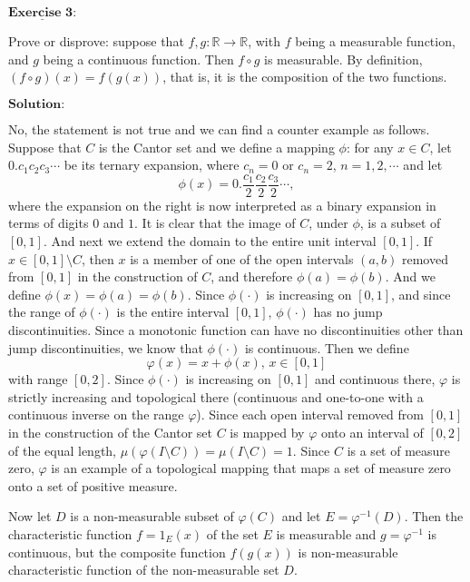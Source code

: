 \documentclass[12pt,a4paper]{ctexart}
\begin{document}
\newpage

$\underline{\textbf{Exercise 3:}}$

Prove or disprove: suppose that $f, g: \mathbb{R} \rightarrow \mathbb{R}$, with $f$ being a measurable function, and $g$ being a continuous function. Then $f \circ g$ is measurable. By definition, $(f \circ g)(x) = f(g(x))$, that is, it is the composition of the two functions.


\vspace{8pt}
$\textbf{Solution:}$

No, the statement is not true and we can find a counter example as follows. Suppose that $C$ is the Cantor set and we define a mapping $\phi$: for any $x \in C$, let $0.c_{1}c_{2}c_{3} \cdots$ be its ternary expansion, where $c_{n} = 0$ or $c_{n} = 2$, $n = 1, 2, \cdots$ and let
\begin{equation*}
    \phi(x) = 0.\frac{c_{1}}{2}\frac{c_{2}}{2}\frac{c_{3}}{2}\cdots,
\end{equation*}
where the expansion on the right is now interpreted as a binary expansion in terms of digits $0$ and $1$. It is clear that the image of $C$, under $\phi$, is a subset of $[0, 1]$. And next we extend the domain to the entire unit interval $[0, 1]$. If $x \in [0, 1] \setminus C $, then $x$ is a member of one of the open intervals $(a, b)$ removed from $[0, 1]$ in the construction of $C$, and therefore $\phi(a) = \phi(b)$. And we define $\phi(x) = \phi(a) = \phi(b)$. Since $\phi(\cdot)$ is increasing on $[0, 1]$, and since the range of $\phi(\cdot)$ is the entire interval $[0, 1]$, $\phi(\cdot)$ has no jump discontinuities. Since a monotonic function can have no discontinuities other than jump discontinuities, we know that $\phi(\cdot)$ is continuous. Then we define
$$\varphi (x) = x + \phi(x), \, x \in [0, 1]$$
with range $[0, 2]$. Since $\phi(\cdot)$ is increasing on $[0, 1]$ and continuous there, $\varphi$ is strictly increasing and topological there (continuous and one-to-one with a continuous inverse on the range $\varphi$). Since each open interval removed from $[0,1]$ in the construction of the Cantor set $C$ is mapped by $\varphi$ onto an interval of $[0, 2]$ of the equal length, $\mu(\varphi(I \setminus C)) = \mu(I \setminus C) = 1$. Since $C$ is a set of measure zero, $\varphi$ is an example of a topological mapping that maps a set of measure zero onto a set of positive measure.

Now let $D$ is a non-measurable subset of $\varphi(C)$ and let $E = \varphi^{-1}(D)$. Then the characteristic function $f = 1_{E}(x)$ of the set $E$ is measurable and $g = \varphi^{-1}$ is continuous, but the composite function $f(g(x))$ is non-measurable characteristic function of the non-measurable set $D$.
\end{document}
